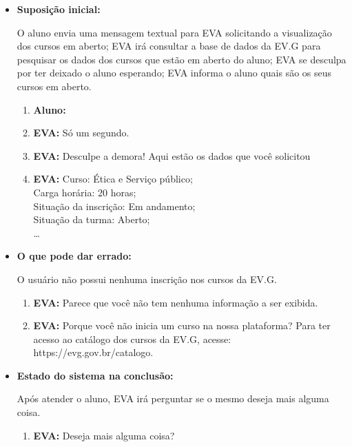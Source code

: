 \begin{itemize}
    \item \textbf{Suposição inicial:}
    
        O aluno envia uma mensagem textual para EVA solicitando a visualização dos cursos em aberto; EVA irá consultar a base de dados da EV.G para pesquisar os dados dos cursos que estão em aberto do aluno; EVA se desculpa por ter deixado o aluno esperando; EVA informa o aluno quais são os seus cursos em aberto.
        
        \begin{enumerate}
            \item \textbf{Aluno:}
            \item \textbf{EVA:} Só um segundo.
            \item \textbf{EVA:} Desculpe a demora! Aqui estão os dados que você solicitou
            \item \textbf{EVA:} Curso: Ética e Serviço público; \\
            Carga horária: 20 horas; \\
            Situação da inscrição: Em andamento; \\
            Situação da turma: Aberto;\\ \ldots
        \end{enumerate}
    
    \item \textbf{O que pode dar errado:}
    
    O usuário não possui nenhuma inscrição nos cursos da EV.G.
    
        \begin{enumerate}
            \item \textbf{EVA:} Parece que você não tem nenhuma informação a ser exibida.
            \item \textbf{EVA:} Porque você não inicia um curso na nossa plataforma? Para ter acesso ao catálogo dos cursos da EV.G, acesse: https://evg.gov.br/catalogo.
        \end{enumerate}
    
    \item \textbf{Estado do sistema na conclusão:}
    
        Após atender o aluno, EVA irá perguntar se o mesmo deseja mais alguma coisa.
        
        \begin{enumerate}
            \item \textbf{EVA:} Deseja mais alguma coisa?
        \end{enumerate}
    
\end{itemize}


